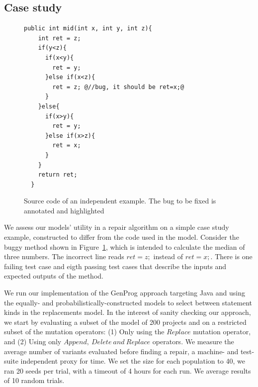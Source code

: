 \documentclass[conference]{IEEEtran}
\begin{document}
\subsection{Case study}
\label{sec:casestudy}


\begin{figure}[t]
\begin{lstlisting}[frame=single,style=base]
  public int mid(int x, int y, int z){
    int ret = z;  
    if(y<z){
      if(x<y){
        ret = y;
      }else if(x<z){
        ret = z; @//bug, it should be ret=x;@
      }
    }else{
      if(x>y){
        ret = y;
      }else if(x>z){
        ret = x;
      }
    }
    return ret;
  }	
	\end{lstlisting}
	\caption{Source code of an independent example. The bug to be fixed is annotated and highlighted}
	\label{fig:initialExample}
\end{figure}

We assess our
models' utility in a repair algorithm on a simple case study example, constructed
to differ from the code used in the model.  Consider the buggy method shown in
Figure~\ref{fig:initialExample}, which is intended to  calculate the median 
of three numbers.  The incorrect line reads 
$ret = z;$ instead of $ret = x;$. There is one failing test case and eigth passing test cases that describe the inputs and expected outputs of the method.

We run our implementation of the GenProg approach targeting Java and using the
equally- and probabilistically-constructed models to select between statement kinds in the replacements model. In the interest of sanity checking our approach, we 
start by evaluating a subset of the model of 200 projects and on a restricted subset of 
the mutation operators: (1) Only using the $Replace$ mutation operator, and (2) Using only $Append,~
Delete~and~Replace$ operators.  We measure the average number of variants
evaluated before finding a repair, a machine- and test-suite independent proxy
for time. We set the size for each population to 40, we ran 20
seeds per trial, with a timeout of 4 hours for each run.  We average results of 10 random trials.
\end{document}
